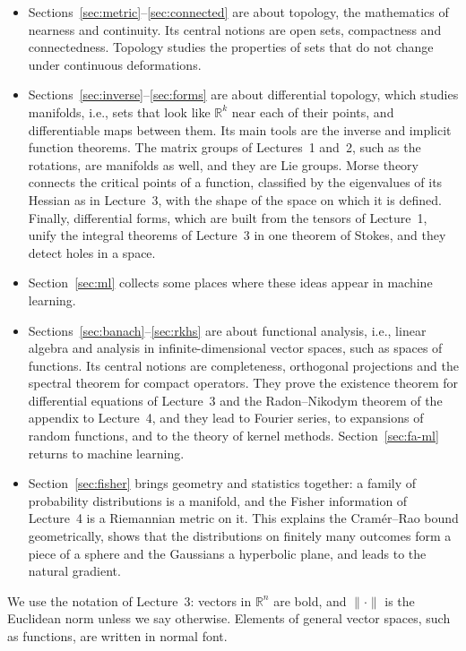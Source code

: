 \documentclass[11pt]{article}
\newcommand{\norm}[1]{\lVert #1 \rVert}
\theoremstyle{definition}
\theoremstyle{plain}
\theoremstyle{remark}
\begin{document}
\begin{itemize}
    \item Sections~\ref{sec:metric}--\ref{sec:connected} are about topology, the mathematics of nearness and continuity. Its central notions are open sets, compactness and connectedness. Topology studies the properties of sets that do not change under continuous deformations.
    \item Sections~\ref{sec:inverse}--\ref{sec:forms} are about differential topology, which studies manifolds, i.e., sets that look like $\mathbb{R}^k$ near each of their points, and differentiable maps between them. Its main tools are the inverse and implicit function theorems. The matrix groups of Lectures~1 and~2, such as the rotations, are manifolds as well, and they are Lie groups. Morse theory connects the critical points of a function, classified by the eigenvalues of its Hessian as in Lecture~3, with the shape of the space on which it is defined. Finally, differential forms, which are built from the tensors of Lecture~1, unify the integral theorems of Lecture~3 in one theorem of Stokes, and they detect holes in a space.
    \item Section~\ref{sec:ml} collects some places where these ideas appear in machine learning.
    \item Sections~\ref{sec:banach}--\ref{sec:rkhs} are about functional analysis, i.e., linear algebra and analysis in infinite-dimensional vector spaces, such as spaces of functions. Its central notions are completeness, orthogonal projections and the spectral theorem for compact operators. They prove the existence theorem for differential equations of Lecture~3 and the Radon--Nikodym theorem of the appendix to Lecture~4, and they lead to Fourier series, to expansions of random functions, and to the theory of kernel methods. Section~\ref{sec:fa-ml} returns to machine learning.
    \item Section~\ref{sec:fisher} brings geometry and statistics together: a family of probability distributions is a manifold, and the Fisher information of Lecture~4 is a Riemannian metric on it. This explains the Cram\'er--Rao bound geometrically, shows that the distributions on finitely many outcomes form a piece of a sphere and the Gaussians a hyperbolic plane, and leads to the natural gradient.
\end{itemize}
We use the notation of Lecture~3: vectors in $\mathbb{R}^n$ are bold, and $\norm{\cdot}$ is the Euclidean norm unless we say otherwise. Elements of general vector spaces, such as functions, are written in normal font.
\end{document}

